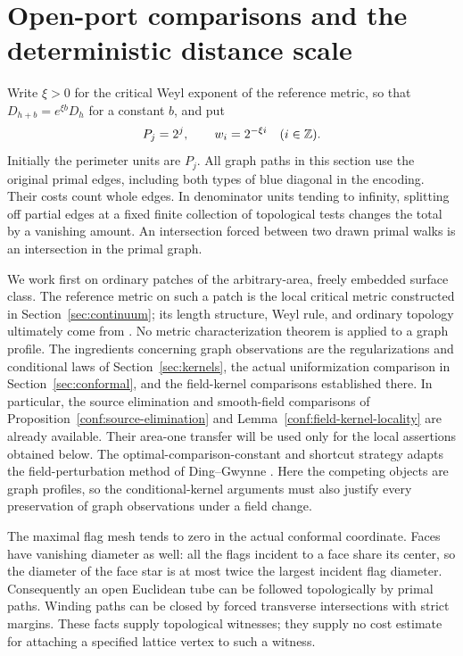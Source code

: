 \section{Open-port comparisons and the deterministic distance scale}\label{sec:metric}

Write $\xi>0$ for the critical Weyl exponent of the reference metric, so that
$D_{h+b}=e^{\xi b}D_h$ for a constant $b$, and put
\[
 P_j=2^j,\qquad w_i=2^{-\xi i}\quad(i\in\mathbb Z).
\]
Initially the perimeter units are $P_j$. All graph paths in this section use
the original primal edges, including both types of blue diagonal in the
encoding. Their costs count whole edges. In denominator units tending to
infinity, splitting off partial edges at a fixed finite collection of
topological tests changes the total by a vanishing amount. An intersection
forced between two drawn primal walks is an intersection in the primal graph.

We work first on ordinary patches of the arbitrary-area, freely embedded
surface class. The reference metric on such a patch is the local critical
metric constructed in Section~\ref{sec:continuum}; its length structure,
Weyl rule, and ordinary topology ultimately come from
\citet{DGuniqueness,DGtopology}. No metric characterization theorem is applied
to a graph profile. The ingredients concerning graph observations are the
regularizations and conditional laws of Section~\ref{sec:kernels}, the actual
uniformization comparison in Section~\ref{sec:conformal}, and the field-kernel
comparisons established there. In particular, the source elimination and
smooth-field comparisons of Proposition~\ref{conf:source-elimination} and
Lemma~\ref{conf:field-kernel-locality} are already available.
Their area-one transfer will be used only for the local assertions obtained
below.  The optimal-comparison-constant and shortcut strategy adapts the
field-perturbation method of Ding--Gwynne
\citep[Sections~1.5 and~3--5]{DGuniqueness}.  Here the competing objects are
graph profiles, so the conditional-kernel arguments must also justify every
preservation of graph observations under a field change.

The maximal flag mesh tends to zero in the actual conformal coordinate.
Faces have vanishing diameter as well: all the flags incident to a face
share its center, so the diameter of the face star is at most twice the
largest incident flag diameter. Consequently an open Euclidean tube can be
followed topologically by primal paths. Winding paths can be closed by
forced transverse intersections with strict margins. These facts supply
topological witnesses; they supply no cost estimate for attaching a specified
lattice vertex to such a witness.

